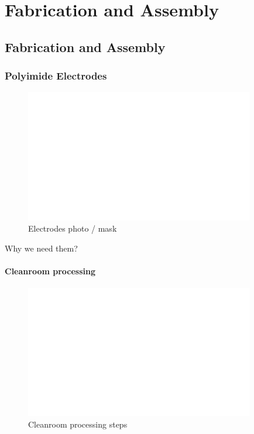 %

\chapter{Fabrication and Assembly}
\label{Ch:Fab}	

\section{Fabrication and Assembly}


\subsection{Polyimide Electrodes}

\begin{figure}[h!]\centering \includegraphics[width=10cm,draft]{figures/foo.png}
      \caption{Electrodes photo / mask}
\end{figure}
Why we need them?


\subsubsection{Cleanroom processing}
\begin{figure}[h!]\centering \includegraphics[width=10cm,draft]{figures/foo.png}
      \caption{Cleanroom processing steps}
\end{figure}

